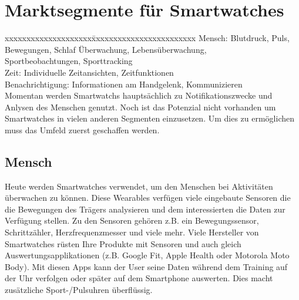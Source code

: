 \section{Marktsegmente für Smartwatches}
\begin{tabbing}
xxxxxxxxxxxxxxxxxxxx\=xxxxxxxxxxxxxxxxxxxxxxxx	\kill
Mensch:		          \> Blutdruck, Puls, Bewegungen, Schlaf Überwachung, Lebensüberwachung, \\\>Sportbeobachtungen, Sporttracking \\
Zeit:			          \> Individuelle Zeitansichten, Zeitfunktionen \\
Benachrichtigung:	  \> Informationen am Handgelenk, Kommunizieren \\

Momentan werden Smartwatchs hauptsächlich zu Notifikationszwecke und Anlysen des Menschen genutzt. Noch ist das Potenzial nicht vorhanden um Smartwatches in vielen anderen Segmenten einzusetzen. Um dies zu ermöglichen muss das Umfeld zuerst geschaffen werden.
\end{tabbing}

\subsection{Mensch}
Heute werden Smartwatches verwendet, um den Menschen bei Aktivitäten überwachen zu können. Diese Wearables verfügen viele eingebaute Sensoren die die Bewegungen des Trägers analysieren und dem interessierten die Daten zur Verfügung stellen. Zu den Sensoren gehören z.B. ein Bewegungssensor, Schrittzähler, Herzfrequenzmesser und viele mehr.
Viele Hersteller von Smartwatches rüsten Ihre Produkte mit Sensoren und auch gleich Auswertungsapplikationen (z.B. Google Fit, Apple Health oder Motorola Moto Body).
Mit diesen Apps kann der User seine Daten während dem Training auf der Uhr verfolgen oder später auf dem Smartphone auswerten. Dies macht zusätzliche Sport-/Pulsuhren überflüssig.

